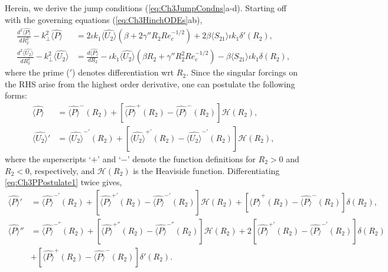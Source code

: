 \documentclass{jfm}
\begin{document}
\section{} \label{App:C}
Herein, we derive the jump conditions (\ref{eq:Ch3JumpCondns}a-d). Starting off with the governing equations (\ref{eq:Ch3HinchODEs}ab),
\begin{subequations}
	\begin{align}
	\frac{d^2 \hat{\langle P\rangle}}{dR_2^2}-k_\perp^2\hat{\langle P\rangle}&=2\iota k_1 \hat{\langle U_2\rangle}(\beta+2\gamma''R_2 Re_c^{-1/2})+2\beta\langle S_{21}\rangle\iota k_1 \delta'(R_2)
	\label{eq:Ch3PprimeprimeODEwithdeltaForcings},\\
	\frac{d^2\hat{\langle U_2\rangle}}{dR_2^2}-k_\perp^2\hat{\langle U_2\rangle}&=\frac{d\hat{\langle P\rangle}}{dR_2}-\iota k_1\hat{\langle U_2\rangle}(\beta R_2+\gamma''R_2^2 Re_c^{-1/2})-\beta\langle S_{21}\rangle\iota k_1 \delta(R_2),
	\label{eq:Ch3UprimeprimeODEwithdeltaForcings}
	\end{align} 
\end{subequations}
where the prime ($'$) denotes differentiation wrt $R_2$. Since the singular forcings on the RHS arise from the highest order derivative, one can postulate the following forms:
\begin{align}
\hat{\langle P\rangle}&=\hat{\langle P\rangle}^-\!\!(R_2)+[\hat{\langle P\rangle}^+(R_2)-\hat{\langle P\rangle}^-(R_2)]\mathcal{H}(R_2), \label{eq:Ch3PPostulate1}\\
\hat{\langle U_2\rangle}'&=\hat{\langle U_2\rangle}^{-'}(R_2)+[\hat{\langle U_2\rangle}^{+'}(R_2)-\hat{\langle U_2\rangle}^{-'}(R_2)]\mathcal{H}(R_2),
\label{eq:Ch3UprimePostulate1}
\end{align}
where the superscripts `$+$' and `$-$' denote the function definitions for $R_2>0$ and $R_2<0$, respectively, and $\mathcal{H}(R_2)$ is the Heaviside function. Differentiating \eqref{eq:Ch3PPostulate1} twice gives, 
\begin{align}
\hat{\langle P\rangle}'&=\hat{\langle P\rangle}^{-'}(R_2)+[\hat{\langle P\rangle}^{+'}(R_2)-\hat{\langle P\rangle}^{-'}(R_2)]\mathcal{H}(R_2)+[\hat{\langle P\rangle}^+(R_2)-\hat{\langle P\rangle}^-(R_2)]\delta(R_2), \label{eq:Ch3PprimePostulate1}\\
\hat{\langle P\rangle}''&=\hat{\langle P\rangle}^{-''}(R_2)+[\hat{\langle P\rangle}^{+''}(R_2)-\hat{\langle P\rangle}^{-''}(R_2)]\mathcal{H}(R_2)+2[\hat{\langle P\rangle}^{+'}(R_2)-\hat{\langle P\rangle}^{-'}(R_2)]\delta(R_2)\nonumber\\
&+[\hat{\langle P\rangle}^+(R_2)-\hat{\langle P\rangle}^-(R_2)]\delta'(R_2). \label{eq:Ch3PprimeprimePostulate1}
\end{align}
\end{document}
